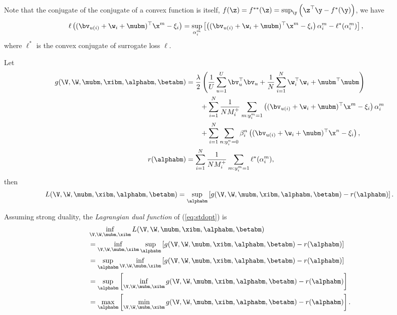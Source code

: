 Note that the conjugate of the conjugate of a convex function is itself, \ie $f(\z) = f^{**}(\z) = \sup_\y \left(\z^\top \y - f^*(\y) \right)$, we have
\begin{equation*}
\begin{aligned}
\ell \left( (\bv_{u(i)} + \w_i + \mubm)^\top \x^m - \xi_i \right)
&= \sup_{\alpha_i^m} \left[ \left( (\bv_{u(i)} + \w_i + \mubm)^\top \x^m - \xi_i \right) \alpha_i^m - \ell^*(\alpha_i^m) \right],
\end{aligned}
\end{equation*}
where $\ell^*$ is the convex conjugate of surrogate loss $\ell$.

Let
\begin{equation*}
\begin{aligned}
g(\V, \W, \mubm, \xibm, \alphabm, \betabm)
&= \frac{\lambda}{2} \left( \frac{1}{U} \sum_{u=1}^U \bv_u^\top \bv_u 
     + \frac{1}{N} \sum_{i=1}^N \w_i^\top \w_i + \mubm^\top \mubm \right) \\
& \hspace{2em}
     + \sum_{i=1}^N \frac{1}{N M_i^+} \sum_{m: y_i^m = 1} \left( (\bv_{u(i)} + \w_i + \mubm)^\top \x^m - \xi_i \right) \alpha_i^m \\
& \hspace{2em}
     + \sum_{i=1}^N \sum_{n: y_i^n = 0} \beta_i^n \left( (\bv_{u(i)} + \w_i + \mubm)^\top \x^n - \xi_i \right), \\
r(\alphabm)
&= \sum_{i=1}^N \frac{1}{N M_i^+} \sum_{m: y_i^m = 1} \ell^*(\alpha_i^m),
\end{aligned}
\end{equation*}
then 
\begin{equation*}
\begin{aligned}
L(\V, \W, \mubm, \xibm, \alphabm, \betabm) 
= \sup_\alphabm \left[ g(\V, \W, \mubm, \xibm, \alphabm, \betabm) - r(\alphabm) \right].
\end{aligned}
\end{equation*}

Assuming strong duality, the \emph{Lagrangian dual function} of (\ref{eq:stdopt}) is
\begin{equation}
\label{eq:dualfunc}
\begin{aligned}
&\inf_{\V, \W, \mubm, \xibm} L(\V, \W, \mubm, \xibm, \alphabm, \betabm) \\
&= \inf_{\V, \W, \mubm, \xibm} \sup_\alphabm \left[ g(\V, \W, \mubm, \xibm, \alphabm, \betabm) - r(\alphabm) \right] \\
&= \sup_\alphabm \inf_{\V, \W, \mubm, \xibm} \left[ g(\V, \W, \mubm, \xibm, \alphabm, \betabm) - r(\alphabm) \right] \\
&= \sup_\alphabm \left[ \inf_{\V, \W, \mubm, \xibm} g(\V, \W, \mubm, \xibm, \alphabm, \betabm) - r(\alphabm) \right] \\
&= \max_\alphabm \left[ \min_{\V, \W, \mubm, \xibm} g(\V, \W, \mubm, \xibm, \alphabm, \betabm) - r(\alphabm) \right].
\end{aligned}
\end{equation}


